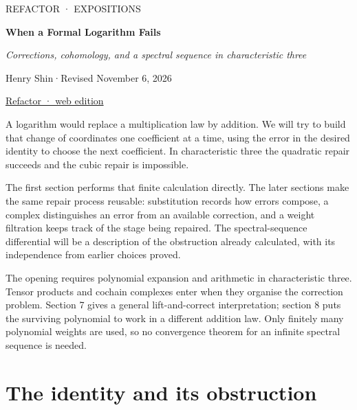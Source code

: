 \documentclass[11pt,letterpaper]{article}
\begin{document}
\color{ink}
\thispagestyle{empty}
{\sffamily\small\textcolor{accent}{REFACTOR · EXPOSITIONS}\par}
\vspace{.6em}
{\LARGE\bfseries When a Formal Logarithm Fails\par}
\vspace{.4em}
{\large\itshape Corrections, cohomology, and a spectral sequence in characteristic three\par}
\vspace{.65em}
{Henry Shin\hspace{.6em}·\hspace{.6em}Revised November 6, 2026\par}
\vspace{.3em}
{\small\href{https://refactor.press/notes/when-a-formal-logarithm-fails.html}{Refactor · web edition}\par}
\vspace{.6em}

A logarithm would replace a multiplication law by addition. We will try to build that change of coordinates one coefficient at a time, using the error in the desired identity to choose the next coefficient. In characteristic three the quadratic repair succeeds and the cubic repair is impossible.


The first section performs that finite calculation directly. The later sections make the same repair process reusable: substitution records how errors compose, a complex distinguishes an error from an available correction, and a weight filtration keeps track of the stage being repaired. The spectral-sequence differential will be a description of the obstruction already calculated, with its independence from earlier choices proved.


The opening requires polynomial expansion and arithmetic in characteristic three. Tensor products and cochain complexes enter when they organise the correction problem. Section 7 gives a general lift-and-correct interpretation; section 8 puts the surviving polynomial to work in a different addition law. Only finitely many polynomial weights are used, so no convergence theorem for an infinite spectral sequence is needed.




\clearpage\thispagestyle{plain}\tableofcontents\clearpage
\section{The identity and its obstruction}\label{sec:identity-and-obstruction}\hypertarget{identity-and-obstruction}{}
\end{document}

